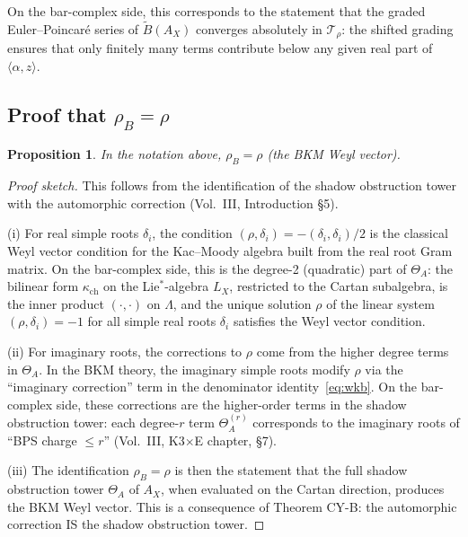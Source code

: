 \documentclass[11pt]{article}
\newtheorem{proposition}[theorem]{Proposition}
\theoremstyle{definition}
\theoremstyle{remark}
\begin{document}
On the bar-complex side, this corresponds to the statement that the
graded Euler--Poincar\'e series of $\widetilde{B}(A_X)$ converges
absolutely in $\mathcal{T}_\rho$: the shifted grading ensures that only
finitely many terms contribute below any given real part of
$\langle\alpha, z\rangle$.

\subsection{Proof that $\rho_B = \rho$}

\begin{proposition}
\label{prop:rho-equals}
In the notation above, $\rho_B = \rho$ (the BKM Weyl vector).
\end{proposition}

\begin{proof}[Proof sketch]
This follows from the identification of the shadow obstruction tower with the
automorphic correction (Vol.~III, Introduction \S5).

(i) For real simple roots $\delta_i$, the condition
$(\rho,\delta_i) = -(\delta_i,\delta_i)/2$ is the classical Weyl vector
condition for the Kac--Moody algebra built from the real root Gram matrix.
On the bar-complex side, this is the degree-2 (quadratic) part of $\Theta_A$:
the bilinear form $\kappa_{\mathrm{ch}}$ on the Lie${}^*$-algebra $L_X$, restricted to
the Cartan subalgebra, is the inner product $(\cdot, \cdot)$ on $\Lambda$,
and the unique solution $\rho$ of the linear system
$(\rho, \delta_i) = -1$ for all simple real roots $\delta_i$
satisfies the Weyl vector condition.

(ii) For imaginary roots, the corrections to $\rho$ come from the higher
degree terms in $\Theta_A$. In the BKM theory, the imaginary simple roots
modify $\rho$ via the ``imaginary correction'' term in the denominator
identity~\eqref{eq:wkb}. On the bar-complex side, these corrections are
the higher-order terms in the shadow obstruction tower: each degree-$r$ term
$\Theta_A^{(r)}$ corresponds to the imaginary roots of ``BPS charge $\leq r$''
(Vol.~III, K3$\times$E chapter, \S7).

(iii) The identification $\rho_B = \rho$ is then the statement that the
full shadow obstruction tower $\Theta_A$ of $A_X$, when evaluated on the Cartan
direction, produces the BKM Weyl vector. This is a consequence of
Theorem CY-B: the automorphic correction IS the shadow obstruction tower.
\end{proof}
\end{document}
